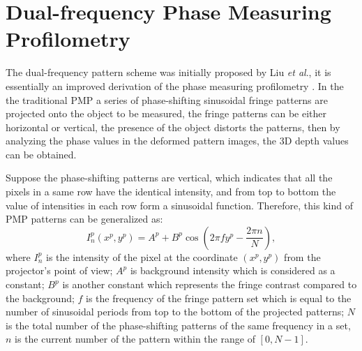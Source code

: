 \documentclass[]{spie}  %
\begin{document}
\section{Dual-frequency Phase Measuring Profilometry}
The dual-frequency pattern scheme was initially proposed by Liu \textit{et al}.\cite{liuk10}, it is essentially  an improved derivation of the phase measuring profilometry \cite{hali89}. In the the traditional PMP a series of phase-shifting sinusoidal fringe patterns are projected onto the object to be measured, the fringe patterns can be either horizontal or vertical, the presence of the object distorts the patterns, then by analyzing the phase values in the deformed pattern images, the 3D depth values can be obtained.

Suppose the phase-shifting patterns are vertical, which indicates that all the pixels in a same row have the identical intensity, and from top to bottom the value of intensities in each row form a sinusoidal function. Therefore, this kind of PMP patterns can be generalized as:
 \begin{equation} \label{eq:1.1}
  	I^p_n(x^p, y^p) = A^p + B^p\cos(2\pi f y^p - \frac{2\pi n}{N}),
  \end{equation}
where $I^p_n$ is the intensity of the pixel at the coordinate $(x^p, y^p)$ from the projector's point of view; $A^p$ is background intensity which is considered as a constant; $B^p$ is another constant which represents the fringe contrast compared to the background; $f$ is the frequency of the fringe pattern set which is equal to the number of sinusoidal periods from top to the bottom of the projected patterns; $N$ is the total number of the phase-shifting patterns of the same frequency in a set, $n$ is the current number of the pattern within the range of $[0, N-1]$.
\end{document}
